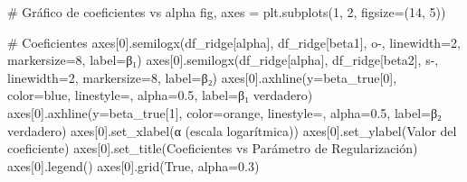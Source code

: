 \documentclass[
  doc,
  floatsintext,
  longtable,
  a4paper,
  nolmodern,
  notxfonts,
  notimes,
  12pt,
  colorlinks=true,linkcolor=blue,citecolor=blue,urlcolor=blue]{apa7}
\newenvironment{Shaded}{\begin{snugshade}}{\end{snugshade}}
\newcommand{\CommentTok}[1]{\textcolor[rgb]{0.37,0.37,0.37}{#1}}
\newcommand{\DecValTok}[1]{\textcolor[rgb]{0.68,0.00,0.00}{#1}}
\newcommand{\FloatTok}[1]{\textcolor[rgb]{0.68,0.00,0.00}{#1}}
\newcommand{\NormalTok}[1]{\textcolor[rgb]{0.00,0.23,0.31}{#1}}
\newcommand{\OperatorTok}[1]{\textcolor[rgb]{0.37,0.37,0.37}{#1}}
\newcommand{\StringTok}[1]{\textcolor[rgb]{0.13,0.47,0.30}{#1}}
\newcommand{\VariableTok}[1]{\textcolor[rgb]{0.07,0.07,0.07}{#1}}
\begin{document}
\begin{Shaded}
\begin{Highlighting}[]
\CommentTok{\# Gráfico de coeficientes vs alpha}
\NormalTok{fig, axes }\OperatorTok{=}\NormalTok{ plt.subplots(}\DecValTok{1}\NormalTok{, }\DecValTok{2}\NormalTok{, figsize}\OperatorTok{=}\NormalTok{(}\DecValTok{14}\NormalTok{, }\DecValTok{5}\NormalTok{))}

\CommentTok{\# Coeficientes}
\NormalTok{axes[}\DecValTok{0}\NormalTok{].semilogx(df\_ridge[}\StringTok{\textquotesingle{}alpha\textquotesingle{}}\NormalTok{], df\_ridge[}\StringTok{\textquotesingle{}beta1\textquotesingle{}}\NormalTok{], }
                 \StringTok{\textquotesingle{}o{-}\textquotesingle{}}\NormalTok{, linewidth}\OperatorTok{=}\DecValTok{2}\NormalTok{, markersize}\OperatorTok{=}\DecValTok{8}\NormalTok{, label}\OperatorTok{=}\StringTok{\textquotesingle{}β₁\textquotesingle{}}\NormalTok{)}
\NormalTok{axes[}\DecValTok{0}\NormalTok{].semilogx(df\_ridge[}\StringTok{\textquotesingle{}alpha\textquotesingle{}}\NormalTok{], df\_ridge[}\StringTok{\textquotesingle{}beta2\textquotesingle{}}\NormalTok{], }
                 \StringTok{\textquotesingle{}s{-}\textquotesingle{}}\NormalTok{, linewidth}\OperatorTok{=}\DecValTok{2}\NormalTok{, markersize}\OperatorTok{=}\DecValTok{8}\NormalTok{, label}\OperatorTok{=}\StringTok{\textquotesingle{}β₂\textquotesingle{}}\NormalTok{)}
\NormalTok{axes[}\DecValTok{0}\NormalTok{].axhline(y}\OperatorTok{=}\NormalTok{beta\_true[}\DecValTok{0}\NormalTok{], color}\OperatorTok{=}\StringTok{\textquotesingle{}blue\textquotesingle{}}\NormalTok{, linestyle}\OperatorTok{=}\StringTok{\textquotesingle{}{-}{-}\textquotesingle{}}\NormalTok{, }
\NormalTok{                alpha}\OperatorTok{=}\FloatTok{0.5}\NormalTok{, label}\OperatorTok{=}\StringTok{\textquotesingle{}β₁ verdadero\textquotesingle{}}\NormalTok{)}
\NormalTok{axes[}\DecValTok{0}\NormalTok{].axhline(y}\OperatorTok{=}\NormalTok{beta\_true[}\DecValTok{1}\NormalTok{], color}\OperatorTok{=}\StringTok{\textquotesingle{}orange\textquotesingle{}}\NormalTok{, linestyle}\OperatorTok{=}\StringTok{\textquotesingle{}{-}{-}\textquotesingle{}}\NormalTok{, }
\NormalTok{                alpha}\OperatorTok{=}\FloatTok{0.5}\NormalTok{, label}\OperatorTok{=}\StringTok{\textquotesingle{}β₂ verdadero\textquotesingle{}}\NormalTok{)}
\NormalTok{axes[}\DecValTok{0}\NormalTok{].set\_xlabel(}\StringTok{\textquotesingle{}α (escala logarítmica)\textquotesingle{}}\NormalTok{)}
\NormalTok{axes[}\DecValTok{0}\NormalTok{].set\_ylabel(}\StringTok{\textquotesingle{}Valor del coeficiente\textquotesingle{}}\NormalTok{)}
\NormalTok{axes[}\DecValTok{0}\NormalTok{].set\_title(}\StringTok{\textquotesingle{}Coeficientes vs Parámetro de Regularización\textquotesingle{}}\NormalTok{)}
\NormalTok{axes[}\DecValTok{0}\NormalTok{].legend()}
\NormalTok{axes[}\DecValTok{0}\NormalTok{].grid(}\VariableTok{True}\NormalTok{, alpha}\OperatorTok{=}\FloatTok{0.3}\NormalTok{)}


\end{Highlighting}
\end{Shaded}
\end{document}

